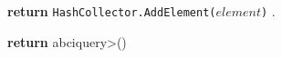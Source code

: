 \begin{figure}[t!]
  \begin{adjustbox}{minipage=[t]{\columnwidth}}
    \begin{algorithm}[H]
      \renewcommand{\thealgorithm}{API Hashchain}         
      \caption{}%
      \label{alg:api-hashchain}%
      \small
      \begin{algorithmic}[1]
      
            \label{alg:hash_add}
                \State \textbf{return} \texttt{HashCollector.AddElement($element$)}
                .
            \EndFunction
      
            \label{alg:hash_get}
                	\State \textbf{return} \<abciquery>()
            \EndFunction
            
        \end{algorithmic}
      \end{algorithm}
	\end{adjustbox}
  \end{figure}
